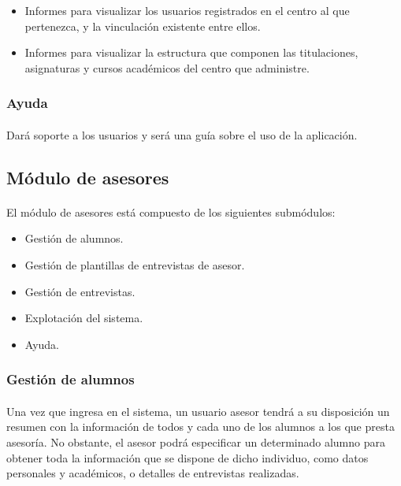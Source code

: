       \begin{itemize}
       \item Informes para visualizar los usuarios registrados en el centro
             al que pertenezca, y la vinculación existente entre ellos.
       \item Informes para visualizar la estructura que componen las
             titulaciones, asignaturas y cursos académicos del centro que
             administre.
      \end{itemize}

      \subsubsection{Ayuda}

      \paragraph{}Dará soporte a los usuarios y será una guía sobre el uso de
      la aplicación.

   \subsection{Módulo de asesores}

      \paragraph{}El módulo de asesores está compuesto de los siguientes
      submódulos:

      \begin{itemize}
       \item Gestión de alumnos.
       \item Gestión de plantillas de entrevistas de asesor.
       \item Gestión de entrevistas.
       \item Explotación del sistema.
       \item Ayuda.
      \end{itemize}

      \subsubsection{Gestión de alumnos}

      \paragraph{}Una vez que ingresa en el sistema, un usuario asesor tendrá
      a su disposición un resumen con la información de todos y cada uno de los
      alumnos a los que presta asesoría. No obstante, el asesor podrá
      especificar un determinado alumno para obtener toda la información que
      se dispone de dicho individuo, como datos personales y académicos, o
      detalles de entrevistas realizadas.

